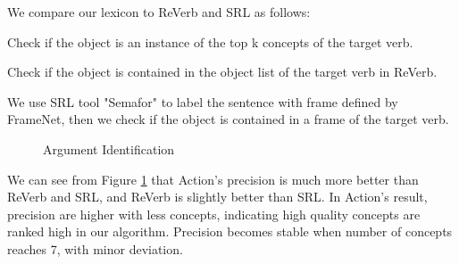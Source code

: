 We compare our lexicon to ReVerb and SRL as follows:
\begin{description}\setlength{\itemsep}{-\itemsep}
\item[Action] Check if the object is an instance of the top k concepts of the target verb.
\item [ReVerb] Check if the object is contained in the object list of the target verb in ReVerb.
\item [SRL(Semafor\cite{chen2010semafor})] We use SRL tool "Semafor" to label the sentence with frame defined by FrameNet, then we check if the object is contained in a frame of the target verb.
\end{description}

\begin{figure}[th]
\centering
{}
\caption{Argument Identification}
\label{fig:argumentidentify}
\end{figure}

We can see from Figure \ref{fig:argumentidentify} that Action's precision is much more better than ReVerb and SRL, and ReVerb is slightly better than SRL. In Action's result, precision are higher with less concepts, indicating high quality concepts are ranked high in our algorithm. Precision becomes stable when number of concepts reaches 7, with minor
deviation.

